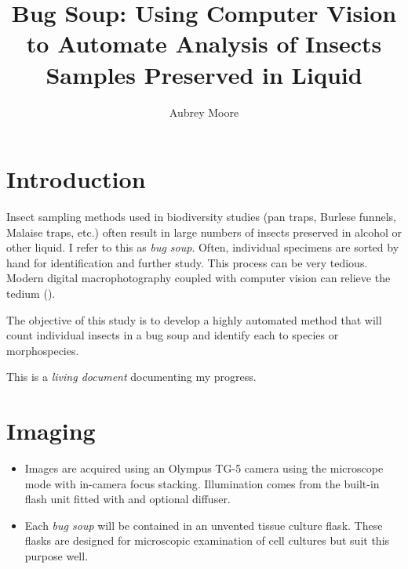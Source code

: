 \documentclass[12pt,letterpaper,english,bibliography=totocnumbered, abstract=on]{scrartcl}
\begin{document}

\title{Bug Soup: Using Computer Vision to Automate Analysis of Insects Samples Preserved in Liquid}

\author{Aubrey Moore}

\maketitle
\newpage
\tableofcontents

\newpage

\section{Introduction}

Insect sampling methods used in biodiversity studies (pan traps, Burlese funnels, Malaise traps, etc.) often result in large numbers of insects preserved in alcohol or other liquid. I refer to this as \textit{bug soup}. Often, individual specimens are sorted by hand for identification and further study. This process can be very tedious. Modern digital macrophotography coupled with computer vision can relieve the tedium (\cite{hoyeDeepLearningComputer2021}).

The objective of this study is to develop a highly automated method that will count individual insects in a bug soup and identify each to species or morphospecies. 

This is a \textit{living document} documenting my progress.

\section{Imaging}

\begin{itemize}
	\item Images are acquired using an Olympus TG-5 camera using the microscope mode with in-camera focus stacking. Illumination comes from the built-in flash unit fitted with and optional diffuser.
	
	\item Each \textit{bug soup} will be contained in an unvented tissue culture flask. These flasks are designed for microscopic examination of cell cultures but suit this purpose well. 
\end{itemize}
\end{document}
